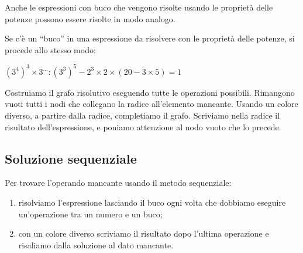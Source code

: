 Anche le espressioni con buco che vengono risolte usando le proprietà 
delle potenze possono essere risolte in modo analogo.

\begin{esempio}{}{}
Se c'è un ``buco'' in una espressione da risolvere con le proprietà delle 
potenze, si procede allo stesso modo:

\((3^4)^3 \times 3^{\dots} : (3^3)^5 -2^3 \times 2 \times 
(20 -3 \times 5) = 1\)

Costruiamo il grafo risolutivo eseguendo tutte le operazioni possibili. 
Rimangono vuoti tutti i nodi che collegano la radice all'elemento
mancante. 
Usando un colore diverso, a partire dalla radice, completiamo il grafo. 
Scriviamo nella radice il risultato dell'espressione, e poniamo attenzione 
al nodo vuoto che lo precede.

\end{esempio}


\subsection{Soluzione sequenziale}

\begin{procedura}{}{}
Per trovare l'operando mancante usando il metodo sequenziale:
\begin{enumerate} [noitemsep]
\item risolviamo l'espressione lasciando il buco ogni volta che 
dobbiamo eseguire un'operazione tra un numero e un buco;
\item con un colore diverso scriviamo il risultato dopo l'ultima operazione
e risaliamo dalla soluzione al dato mancante.
\end{enumerate}
\end{procedura}

